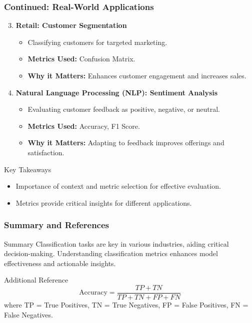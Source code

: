 \documentclass[aspectratio=169]{beamer}
\begin{document}
\begin{frame}[fragile]
    \frametitle{Continued: Real-World Applications}
    \begin{enumerate}
        \setcounter{enumi}{2}
        \item \textbf{Retail: Customer Segmentation}
            \begin{itemize}
                \item Classifying customers for targeted marketing.
                \item \textbf{Metrics Used:} Confusion Matrix.
                \item \textbf{Why it Matters:} Enhances customer engagement and increases sales.
            \end{itemize}
        \item \textbf{Natural Language Processing (NLP): Sentiment Analysis}
            \begin{itemize}
                \item Evaluating customer feedback as positive, negative, or neutral.
                \item \textbf{Metrics Used:} Accuracy, F1 Score.
                \item \textbf{Why it Matters:} Adapting to feedback improves offerings and satisfaction.
            \end{itemize}
    \end{enumerate}
    \begin{block}{Key Takeaways}
        \begin{itemize}
            \item Importance of context and metric selection for effective evaluation.
            \item Metrics provide critical insights for different applications.
        \end{itemize}
    \end{block}
\end{frame}

\begin{frame}[fragile]
    \frametitle{Summary and References}
    \begin{block}{Summary}
        Classification tasks are key in various industries, aiding critical decision-making. Understanding classification metrics enhances model effectiveness and actionable insights.
    \end{block}
    \begin{block}{Additional Reference}
        \[
        \text{Accuracy} = \frac{TP + TN}{TP + TN + FP + FN}
        \]
        where TP = True Positives, TN = True Negatives, FP = False Positives, FN = False Negatives.
    \end{block}
\end{frame}
\end{document}
